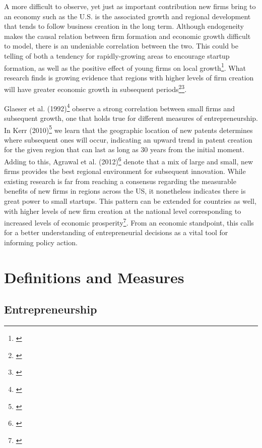 A more difficult to observe, yet just as important contribution new firms bring to an economy such as the U.S. is the associated growth and regional development that tends to follow business creation in the long term. Although endogeneity makes the causal relation between firm formation and economic growth difficult to model, there is an undeniable correlation between the two. This could be telling of both a tendency for rapidly-growing areas to encourage startup formation, as well as the positive effect of young firms on local growth\footnote{\cite{ChatterjiGlaeserKerr2014}}. What research finds is growing evidence that regions with higher levels of firm creation will have greater economic growth in subsequent periods\footnote{\cite{GartnerShaverCarterReynolds2004}}\hspace{.2em}\footnote{\cite{AcsArmington2006}}. 

Glaeser et al. (1992)\footnote{\cite{GlaeserKallalScheinkmanShleifer1992}} observe a strong correlation between small firms and subsequent growth, one that holds true for different measures of entrepreneurship. In Kerr (2010)\footnote{\cite{Kerr2010}} we learn that the geographic location of new patents determines where subsequent ones will occur, indicating an upward trend in patent creation for the given region that can last as long as 30 years from the initial moment. Adding to this, Agrawal et al. (2012)\footnote{\cite{AgrawalCockburnGalassoOettl2012}} denote that a mix of large and small, new firms provides the best regional environment for subsequent innovation. While existing research is far from reaching a consensus regarding the measurable benefits of new firms in regions across the US, it nonetheless indicates there is great power to small startups. This pattern can be extended for countries as well, with higher levels of new firm creation at the national level corresponding to increased levels of economic prosperity\footnote{\cite{GartnerShaverCarterReynolds2004}}. From an economic standpoint, this calls for a better understanding of entrepreneurial decisions as a vital tool for informing policy action. 

\section{Definitions and Measures}

\subsection{Entrepreneurship}

